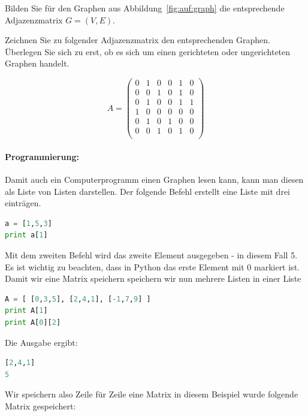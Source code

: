 \begin{aufg}
Bilden Sie für den Graphen aus Abbildung~\ref{fig:auf:graph} die entsprechende Adjazenzmatrix $G=(V,E)$.
\end{aufg}



\begin{aufg}
Zeichnen Sie zu folgender Adjazenzmatrix den entsprechenden Graphen.
Überlegen Sie sich zu erst, ob es sich um einen gerichteten oder ungerichteten Graphen handelt.


\[A =  \begin{pmatrix}
  0 & 1 & 0 & 0 & 1 & 0 \\
  0 & 0 & 1 & 0 & 1 & 0 \\
  0 & 1 & 0 & 0 & 1 & 1 \\
  1 & 0 & 0 & 0 & 0 & 0 \\
  0 & 1 & 0 & 1 & 0 & 0 \\
  0 & 0 & 1 & 0 & 1 & 0 \\
 \end{pmatrix}
  \]
  
\end{aufg}

\paragraph{Programmierung:}
Damit auch ein Computerprogramm einen Graphen lesen kann, kann man diesen als Liste von Listen darstellen. 
Der folgende Befehl erstellt eine Liste mit drei einträgen.
\begin{lstlisting}[language=Python,basicstyle=\small,tabsize=3]
a = [1,5,3]
print a[1]
\end{lstlisting}
Mit dem zweiten Befehl wird das zweite Element ausgegeben - in diesem Fall 5. 
Es ist wichtig zu beachten, dass in Python das erste Element mit 0 markiert ist. 
Damit wir eine Matrix speichern speichern wir nun mehrere Listen in einer Liste
\begin{lstlisting}[language=Python,basicstyle=\small,tabsize=3]
A = [ [0,3,5], [2,4,1], [-1,7,9] ]
print A[1]
print A[0][2]
\end{lstlisting}
Die Ausgabe ergibt:
\begin{lstlisting}[language=Python,basicstyle=\small,tabsize=3]
[2,4,1]
5
\end{lstlisting}
Wir speichern also Zeile für Zeile eine Matrix in diesem Beispiel wurde folgende Matrix gespeichert:

